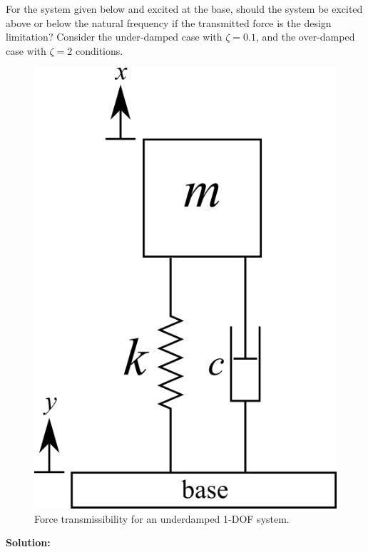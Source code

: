 \documentclass[12pt,letter]{article}
\begin{document}
		\begin{example}
			
			For the system given below and excited at the base, should the system be excited above or below the natural frequency if the transmitted force is the design limitation? Consider the under-damped case with $\zeta=0.1$, and the over-damped case with $\zeta=2$ conditions. 

			\begin{figure}[H]
				\centering
				\includegraphics[]{../figures/1_DOF_spring_dashpot_mass_vertical_base_excited.png}
				\caption{Force transmissibility for an underdamped 1-DOF system.}
			\end{figure}		
		
			\noindent\textbf{Solution:}


\end{example}
\end{document}
